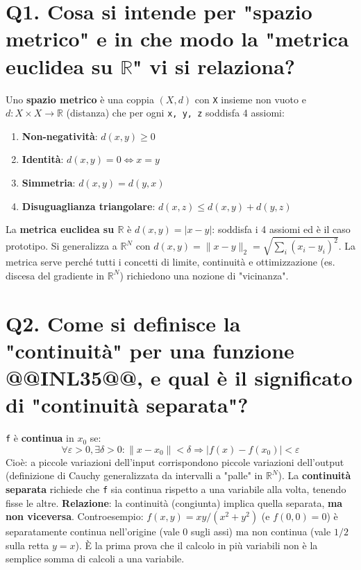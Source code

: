 \documentclass[11pt,a4paper]{article}
\begin{document}
\section*{Q1. Cosa si intende per "spazio metrico" e in che modo la "metrica euclidea su $\mathbb{R}$" vi si relaziona?}
Uno \textbf{spazio metrico} è una coppia $(X, d)$ con \texttt{X} insieme non vuoto e $d: X \times  X \to  \mathbb{R}$ (distanza) che per ogni \texttt{x, y, z} soddisfa 4 assiomi:
\begin{enumerate}
\item \textbf{Non-negatività}: $d(x,y) \ge  0$
\item \textbf{Identità}: $d(x,y) = 0 \Leftrightarrow  x = y$
\item \textbf{Simmetria}: $d(x,y) = d(y,x)$
\item \textbf{Disuguaglianza triangolare}: $d(x,z) \le  d(x,y) + d(y,z)$
\end{enumerate}
La \textbf{metrica euclidea su $\mathbb{R}$} è $d(x,y) = |x - y|$: soddisfa i 4 assiomi ed è il caso prototipo. Si generalizza a $\mathbb{R}^{N}$ con $d(x,y) = \|x - y\|_{2} = \sqrt{\sum _{i}(x_{i} - y_{i})^{2}}$. La metrica serve perché tutti i concetti di limite, continuità e ottimizzazione (es. discesa del gradiente in $\mathbb{R}^{N}$) richiedono una nozione di "vicinanza".
\newpage
\section*{Q2. Come si definisce la "continuità" per una funzione @@INL35@@, e qual è il significato di "continuità separata"?}
\texttt{f} è \textbf{continua} in $x_{0}$ se:
\[ \forall \varepsilon  > 0, \exists \delta  > 0 : \|x - x_{0}\| < \delta  \Rightarrow  |f(x) - f(x_{0})| < \varepsilon  \]
Cioè: a piccole variazioni dell'input corrispondono piccole variazioni dell'output (definizione di Cauchy generalizzata da intervalli a "palle" in $\mathbb{R}^{N}$).
La \textbf{continuità separata} richiede che \texttt{f} sia continua rispetto a una variabile alla volta, tenendo fisse le altre.
\textbf{Relazione}: la continuità (congiunta) implica quella separata, \textbf{ma non viceversa}. Controesempio: $f(x,y) = xy/(x^{2}+y^{2})$ (e $f(0,0)=0$) è separatamente continua nell'origine (vale 0 sugli assi) ma non continua (vale $1/2$ sulla retta $y=x$). È la prima prova che il calcolo in più variabili non è la semplice somma di calcoli a una variabile.
\newpage
\end{document}
